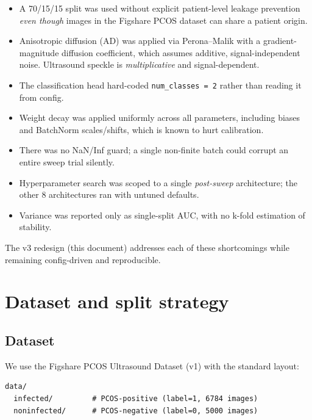 \documentclass[10pt,a4paper]{article}
\begin{document}
\begin{itemize}[leftmargin=*]
  \item A 70/15/15 split was used without explicit patient-level
        leakage prevention \textit{even though} images in the Figshare
        PCOS dataset can share a patient origin.
  \item Anisotropic diffusion (AD) was applied via
        Perona--Malik with a gradient-magnitude diffusion coefficient,
        which assumes additive, signal-independent noise. Ultrasound
        speckle is \textit{multiplicative} and signal-dependent.
  \item The classification head hard-coded \texttt{num\_classes = 2}
        rather than reading it from config.
  \item Weight decay was applied uniformly across all parameters,
        including biases and BatchNorm scales/shifts, which is known
        to hurt calibration.
  \item There was no NaN/Inf guard; a single non-finite batch could
        corrupt an entire sweep trial silently.
  \item Hyperparameter search was scoped to a single
        \textit{post-sweep} architecture; the other 8 architectures
        ran with untuned defaults.
  \item Variance was reported only as single-split AUC, with no
        k-fold estimation of stability.
\end{itemize}

The v3 redesign (this document) addresses each of these shortcomings
while remaining config-driven and reproducible.

\section{Dataset and split strategy}

\subsection{Dataset}

We use the Figshare PCOS Ultrasound Dataset (v1) with the standard
layout:

\begin{verbatim}
data/
  infected/         # PCOS-positive (label=1, 6784 images)
  noninfected/      # PCOS-negative (label=0, 5000 images)
\end{verbatim}
\end{document}
